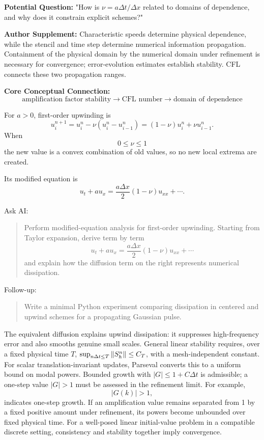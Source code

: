 \begin{authornote}
\textbf{Potential Question:}
"How is \(\nu=a\Delta t/\Delta x\) related to domains of dependence, and why does it constrain explicit schemes?"

\textbf{Author Supplement:}
Characteristic speeds determine physical dependence, while the stencil and time step determine numerical information propagation. Containment of the physical domain by the numerical domain under refinement is necessary for convergence; error-evolution estimates establish stability. CFL connects these two propagation ranges.

\textbf{Core Conceptual Connection:}
\[
\text{amplification factor stability}
\longrightarrow
\text{CFL number}
\longrightarrow
\text{domain of dependence}
\]
\end{authornote}

For \(a>0\), first-order upwinding is
\[
u_i^{n+1}
=
u_i^n-\nu(u_i^n-u_{i-1}^n)
=
(1-\nu)u_i^n+\nu u_{i-1}^n.
\]
When
\[
0\le\nu\le1
\]
the new value is a convex combination of old values, so no new local extrema are created.

Its modified equation is
\[
u_t+au_x
=
\frac{a\Delta x}{2}(1-\nu)u_{xx}
+\cdots.
\]

\begin{askai}
Ask AI:
\begin{quote}
Perform modified-equation analysis for first-order upwinding. Starting from Taylor expansion, derive term by term
\[
u_t+au_x=\frac{a\Delta x}{2}(1-\nu)u_{xx}+\cdots
\]
and explain how the diffusion term on the right represents numerical dissipation.
\end{quote}

Follow-up:
\begin{quote}
Write a minimal Python experiment comparing dissipation in centered and upwind schemes for a propagating Gaussian pulse.
\end{quote}
\end{askai}

The equivalent diffusion explains upwind dissipation: it suppresses high-frequency error and also smooths genuine small scales.
General linear stability requires, over a fixed physical time $T$,
$\sup_{n\Delta t\le T}\left\lVert S_h^n\right\rVert\le C_T$, with a mesh-independent constant.
For scalar translation-invariant updates, Parseval converts this to a uniform bound on modal powers.
Bounded growth with $|G|\le1+C\Delta t$ is admissible; a one-step value $|G|>1$ must be assessed in the refinement limit.
For example,
\[
|G(k)|>1,
\]
indicates one-step growth. If an amplification value remains separated from 1 by a fixed positive amount under refinement, its powers become unbounded over fixed physical time.
For a well-posed linear initial-value problem in a compatible discrete setting, consistency and stability together imply convergence.

